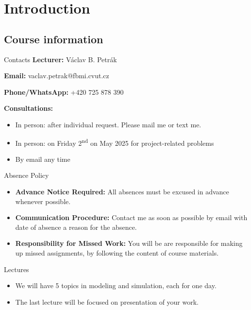 \section{Introduction}
\subsection{Course information}
\begin{frame}{Contacts}
    \textbf{Lecturer:} Václav B. Petrák  

    \textbf{Email:} vaclav.petrak@fbmi.cvut.cz  

    \textbf{Phone/WhatsApp:} +420 725 878 390

    \vspace{1em}
    \textbf{Consultations:} 
    \begin{itemize}
        \item In person: after individual request. Please mail me or text me.
        \item In person: on Friday 2\textsuperscript{nd} on May 2025 for project-related problems
        \item By email any time
    \end{itemize}

\end{frame}

\begin{frame}{Absence Policy}
\begin{itemize}
    \item \textbf{Advance Notice Required:} All absences must be excused in advance whenever possible.

    \item \textbf{Communication Procedure:}  Contact me  as soon as possible by email with date of absence a reason for the absence.

    \item \textbf{Responsibility for Missed Work:} You will be are responsible for making up missed assignments, by following the content of course materials.  
\end{itemize}
 

\end{frame}

\begin{frame}{Lectures}
\Large
\begin{itemize}
    \item We will have 5 topics in modeling and simulation, each for one day.
    \item The last lecture will be focused on presentation of your work. 
\end{itemize}
\end{frame}

